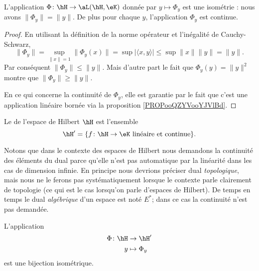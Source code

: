\begin{lemma}       \label{LemjYVcHE}
    L'application  \( \Phi\colon \hH\to \aL(\hH,\eK)\) donnée par \( y\mapsto\Phi_y\) est une isométrie : nous avons \( \| \Phi_y \|=\| y \|\). De plus pour chaque \( y\), l'application \( \Phi_y\) est continue.
\end{lemma}

\begin{proof}
    En utilisant la définition de la norme opérateur et l'inégalité de Cauchy-Schwarz,
    \begin{equation}
        \| \Phi_y \|=\sup_{\| x \| =1}\| \Phi_y(x) \|=\sup| \langle x, y\rangle  |\leq\sup\| x \|\| y \|=\| y \|.
    \end{equation}
    Par conséquent \( \| \Phi_y \|\leq\| y \|\). Mais d'autre part le fait que \( \Phi_y(y)=\| y \|^2\) montre que \( \| \Phi_y \|\geq \| y \|\).

    En ce qui concerne la continuité de \( \Phi_y\), elle est garantie par le fait que c'est une application linéaire bornée via la proposition \ref{PROPooQZYVooYJVlBd}.
\end{proof}

\begin{definition}
    Le  de l'espace de Hilbert \( \hH\) est l'ensemble
    \begin{equation}
        \hH'=\{ f\colon \hH\to \eK\text{ linéaire et continue} \}.
    \end{equation}
\end{definition}
Notons que dans le contexte des espaces de Hilbert nous demandons la continuité des éléments du dual parce qu'elle n'est pas automatique par la linéarité dans les cas de dimension infinie. En principe nous devrions préciser dual \emph{topologique}, mais nous ne le ferons pas systématiquement lorsque le contexte parle clairement de topologie (ce qui est le cas lorsqu'on parle d'espaces de Hilbert). De temps en temps le dual \emph{algébrique} d'un espace est noté \( E^*\); dans ce cas la continuité n'est pas demandée.

\begin{theorem}        \label{ThoQgTovL}
    L'application
    \begin{equation}
        \begin{aligned}
            \Phi\colon \hH&\to \hH' \\
            y&\mapsto \Phi_y 
        \end{aligned}
    \end{equation}
    est une bijection isométrique.
\end{theorem}


